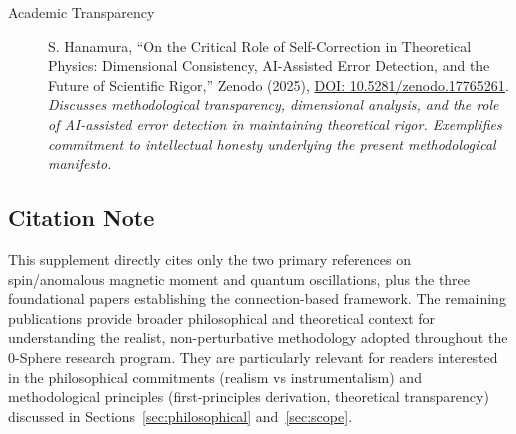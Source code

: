 \documentclass[12pt,letterpaper]{article}
\begin{document}
\begin{description}
\item[Academic Transparency] S. Hanamura, ``On the Critical Role of Self-Correction in Theoretical Physics: Dimensional Consistency, AI-Assisted Error Detection, and the Future of Scientific Rigor,'' Zenodo (2025), \href{https://doi.org/10.5281/zenodo.17765261}{DOI: 10.5281/zenodo.17765261}. \\
\textit{Discusses methodological transparency, dimensional analysis, and the role of AI-assisted error detection in maintaining theoretical rigor. Exemplifies commitment to intellectual honesty underlying the present methodological manifesto.}
\end{description}

\subsection*{Citation Note}

This supplement directly cites only the two primary references on spin/anomalous magnetic moment and quantum oscillations, plus the three foundational papers establishing the connection-based framework. The remaining publications provide broader philosophical and theoretical context for understanding the realist, non-perturbative methodology adopted throughout the 0-Sphere research program. They are particularly relevant for readers interested in the philosophical commitments (realism vs instrumentalism) and methodological principles (first-principles derivation, theoretical transparency) discussed in Sections~\ref{sec:philosophical} and~\ref{sec:scope}.
\end{document}
